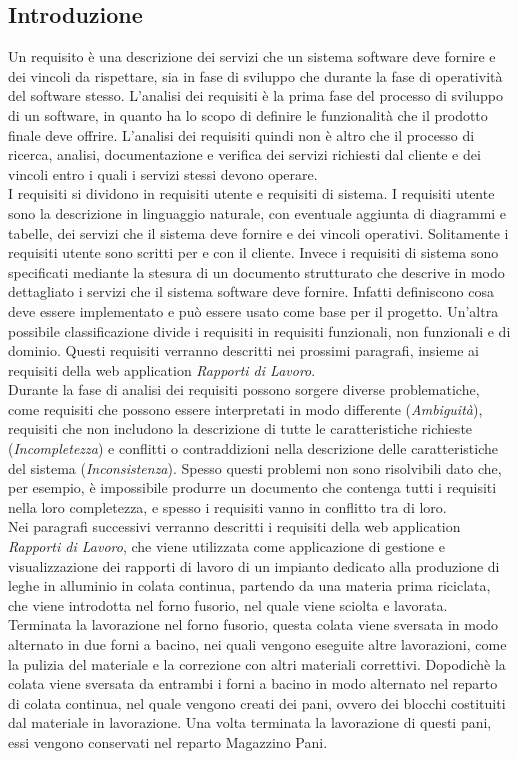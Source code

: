   \subsection{Introduzione}
  Un requisito è una descrizione dei servizi che un sistema software deve fornire e dei vincoli 
  da rispettare, sia in fase di sviluppo che durante la fase di operatività del software stesso. 
  L'analisi dei requisiti è la prima fase del processo di sviluppo di un software, in quanto ha lo scopo di 
  definire le funzionalità che il prodotto finale deve offrire. L'analisi dei requisiti quindi non è altro che 
  il processo di ricerca, analisi, documentazione e verifica dei servizi richiesti dal cliente e dei vincoli entro 
  i quali i servizi stessi devono operare.\\
  I requisiti si dividono in requisiti utente e requisiti di sistema. I requisiti utente sono la descrizione 
  in linguaggio naturale, con eventuale aggiunta di diagrammi e tabelle, dei servizi che il sistema deve fornire e 
  dei vincoli operativi. Solitamente i requisiti utente sono scritti per e con il cliente. Invece i requisiti di sistema 
  sono specificati mediante la stesura di un documento strutturato che descrive in modo dettagliato i servizi che il 
  sistema software deve fornire. Infatti definiscono cosa deve essere implementato e può essere usato come 
  base per il progetto. Un'altra possibile classificazione divide i requisiti in requisiti funzionali, non funzionali e di dominio. 
  Questi requisiti verranno descritti nei prossimi paragrafi, insieme ai requisiti della web application \textit{Rapporti di Lavoro}.\\
  Durante la fase di analisi dei requisiti possono sorgere diverse problematiche, come requisiti che possono essere 
  interpretati in modo differente (\textit{Ambiguità}), requisiti che non includono la descrizione di tutte le caratteristiche richieste (\textit{Incompletezza}) e 
  conflitti o contraddizioni nella descrizione delle caratteristiche del sistema (\textit{Inconsistenza}). Spesso questi problemi 
  non sono risolvibili dato che, per esempio, è impossibile produrre un documento che contenga tutti i requisiti nella loro completezza, e 
  spesso i requisiti vanno in conflitto tra di loro.\\
  Nei paragrafi successivi verranno descritti i requisiti della web application \textit{Rapporti di Lavoro}, che viene utilizzata 
  come applicazione di gestione e visualizzazione dei rapporti di lavoro di un impianto dedicato alla 
  produzione di leghe in alluminio in colata continua, partendo da una materia prima riciclata, che viene introdotta nel forno fusorio, 
  nel quale viene sciolta e lavorata. Terminata la lavorazione nel forno fusorio, questa colata viene sversata in modo alternato in due forni 
  a bacino, nei quali vengono eseguite altre lavorazioni, come la pulizia del materiale e la correzione con altri materiali correttivi. Dopodichè 
  la colata viene sversata da entrambi i forni a bacino in modo alternato nel reparto di colata continua, nel quale vengono creati dei pani, ovvero dei 
  blocchi costituiti dal materiale in lavorazione. Una volta terminata la lavorazione di questi pani, essi vengono conservati nel reparto Magazzino Pani. 

